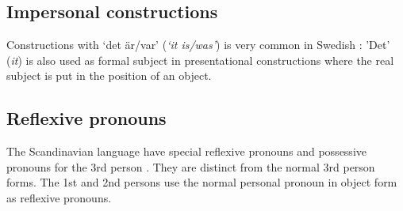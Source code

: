 \documentclass{report}
\begin{document}
\subsection*{Impersonal constructions}
Constructions with `det är/var' (\emph{`it is/was'}) is very common in Swedish \cite[\textsection 309d]{H&H}:
'Det' (\emph{it}) is also used as formal subject in presentational constructions where
the real subject is put in the position of an object.

\subsection*{Reflexive pronouns}
\label{swe:refl}
The Scandinavian language have special reflexive pronouns
and possessive pronouns for the 3rd
person \cite[ \& 319]{H&H}. They are distinct from the normal 3rd person forms.
The 1st and 2nd persons use the normal personal pronoun in object form as reflexive
pronouns.

\end{document}
